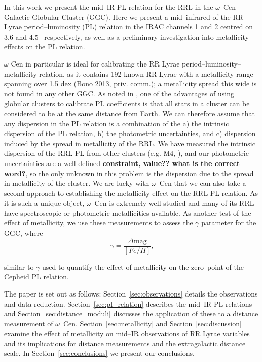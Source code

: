 \documentclass[a4paper,fleqn,usenatbib]{mnras}
\begin{document}
In this work we present the mid--IR PL relation for the RRL in the $\omega$~Cen Galactic Globular Cluster (GGC). 
Here we present a mid--infrared of the RR Lyrae period--luminosity (PL) relation in the IRAC channels 1 and 2 centred on 3.6 and 4.5 \micron\ respectively, as well as a preliminary investigation into metallicity effects on the PL relation.



$\omega$ Cen in particular is ideal for calibrating the RR Lyrae period--luminosity--metallicity relation, as it contains 192 known RR Lyrae \citep{2004A&A...424.1101K} with a metallicity range spanning over 1.5 dex (Bono 2013, priv. comm.); a metallicity spread this wide is not found in any other GGC. As noted in \citet{2006MNRAS.372.1675S}, one of the advantages of using globular clusters to calibrate PL coefficients is that all stars in a cluster can be considered to be at the same distance from Earth. We can therefore assume that any dispersion in the PL relation is a combination of the a) the intrinsic dispersion of the PL relation, b) the photometric uncertainties, and c) dispersion induced by the spread in metallicity of the RRL. We have measured the intrinsic dispersion of the RRL PL from other clusters (e.g. M4, \citet{2015arXiv150507858N}), and our photometric uncertainties are a well defined \textbf{constraint, value?? what is the correct word?}, so the only unknown in this problem is the dispersion due to the spread in metallicity of the cluster. We are lucky with $\omega$~Cen that we can also take a second approach to establishing the metallicity effect on the RRL PL relation. As it is such a unique object, $\omega$~Cen is extremely well studied and many of its RRL have spectroscopic or photometric metallicities available. As another test of the effect of metallicity, we use these measurements to assess the $\gamma$ parameter for the GGC, where 
\begin{equation} \label{eqn:gamma}
\gamma = \dfrac {\Delta \text{mag}} {[Fe/H]}\text{,}
\end{equation}

similar to $\gamma$ used to quantify the effect of metallicity on the zero--point of the Cepheid PL relation. 

The paper is set out as follows: Section~\ref{sec:observations} details the observations and data reduction. Section~\ref{sec:pl_relation} describes the mid--IR PL relations and Section~\ref{sec:distance_moduli} discusses the application of these to a distance measurement of  $\omega$~Cen. Section~\ref{sec:metallicity} and Section~\ref{sec:discussion} examine the effect of metallicity on mid--IR observations of RR Lyrae variables and its implications for distance measurements and the extragalactic distance scale. In Section~\ref{sec:conclusions} we present our conclusions.
\end{document}
